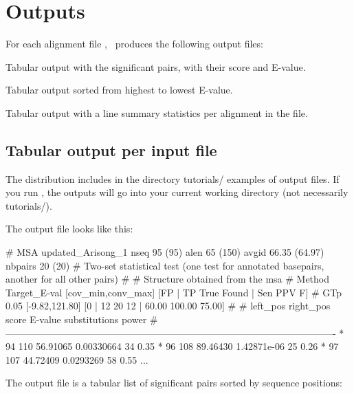 \label{section:outputs}
\setcounter{footnote}{0}
\section{Outputs}

For each alignment file , \rscape\, produces the
following output files:

\begin{sreitems}{}
\item[\emprog{rnafile.out}] Tabular output with the significant pairs,
  with their score and E-value.
%
\item[\emprog{rnafile.sorted.out}] Tabular output sorted from highest to
  lowest E-value.
%
%
\item[\emprog{rnafile.sum}] Tabular output with a line summary statistics
  per alignment in the file.
%
\end{sreitems}

\subsection{Tabular output per input file}

The distribution includes in the directory tutorials/ examples of
output files. If you run \rscape, the outputs will go into your
current working directory (not necessarily tutorials/).

The output file  looks like this:

\begin{sreoutput}
# MSA updated_Arisong_1 nseq 95 (95) alen 65 (150) avgid 66.35 (64.97) nbpairs 20 (20)
# Two-set statistical test (one test for annotated basepairs, another for all other pairs)
#
# Structure obtained from the msa
# Method Target_E-val [cov_min,conv_max] [FP | TP True Found | Sen PPV F] 
# GTp    0.05           [-9.82,121.80]    [0 | 12 20 12 | 60.00 100.00 75.00] 
#
#       left_pos       right_pos        score          E-value       substitutions      power
#-------------------------------------------------------------------------------------------------------
*               94             110      56.91065        0.00330664      34              0.35
*               96             108      89.46430        1.42871e-06     25              0.26
*               97             107      44.72409        0.0293269       58              0.55
...
\end{sreoutput}
The output file is a tabular list of significant pairs sorted by sequence positions:

